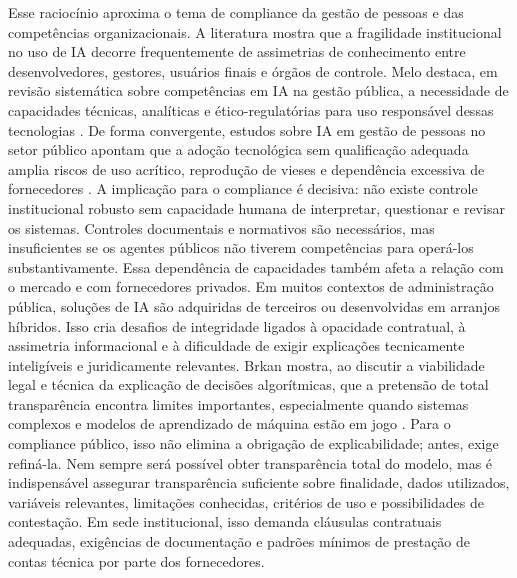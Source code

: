 \documentclass[12pt,a4paper]{article}
\begin{document}
Esse raciocínio aproxima o tema de compliance da gestão de pessoas e das competências organizacionais. A literatura mostra que a fragilidade institucional no uso de IA decorre frequentemente de assimetrias de conhecimento entre desenvolvedores, gestores, usuários finais e órgãos de controle. Melo destaca, em revisão sistemática sobre competências em IA na gestão pública, a necessidade de capacidades técnicas, analíticas e ético-regulatórias para uso responsável dessas tecnologias \autocite{melo2026competencias}. De forma convergente, estudos sobre IA em gestão de pessoas no setor público apontam que a adoção tecnológica sem qualificação adequada amplia riscos de uso acrítico, reprodução de vieses e dependência excessiva de fornecedores \autocite{chilunjika2022artificial} \autocite{cho2023human} \autocite{barros2025inteligencia}. A implicação para o compliance é decisiva: não existe controle institucional robusto sem capacidade humana de interpretar, questionar e revisar os sistemas. Controles documentais e normativos são necessários, mas insuficientes se os agentes públicos não tiverem competências para operá-los substantivamente.
Essa dependência de capacidades também afeta a relação com o mercado e com fornecedores privados. Em muitos contextos de administração pública, soluções de IA são adquiridas de terceiros ou desenvolvidas em arranjos híbridos. Isso cria desafios de integridade ligados à opacidade contratual, à assimetria informacional e à dificuldade de exigir explicações tecnicamente inteligíveis e juridicamente relevantes. Brkan mostra, ao discutir a viabilidade legal e técnica da explicação de decisões algorítmicas, que a pretensão de total transparência encontra limites importantes, especialmente quando sistemas complexos e modelos de aprendizado de máquina estão em jogo \autocite{brkan2020legal}. Para o compliance público, isso não elimina a obrigação de explicabilidade; antes, exige refiná-la. Nem sempre será possível obter transparência total do modelo, mas é indispensável assegurar transparência suficiente sobre finalidade, dados utilizados, variáveis relevantes, limitações conhecidas, critérios de uso e possibilidades de contestação. Em sede institucional, isso demanda cláusulas contratuais adequadas, exigências de documentação e padrões mínimos de prestação de contas técnica por parte dos fornecedores.
\end{document}
